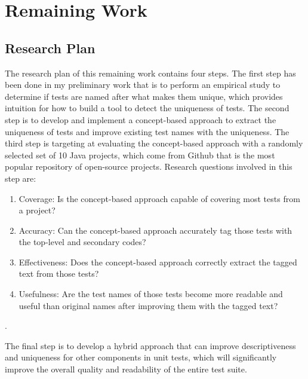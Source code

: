 

\section{Remaining Work}
\label{sec:remaining-work}

\subsection{Research Plan}

The research plan of this remaining work contains four steps.
%
The first step has been done in my preliminary work that is to perform an empirical study to determine if tests are named after what makes them unique, which provides intuition for how to build a tool to detect the uniqueness of tests.
%
The second step is to develop and implement a concept-based approach to extract the uniqueness of tests and improve existing test names with the uniqueness.
%
The third step is targeting at evaluating the concept-based approach with a randomly selected set of \num{10} Java projects, which come from Github that is the most popular repository of open-source projects.
%
Research questions involved in this step are:
\begin{enumerate}
    \item Coverage: Is the concept-based approach capable of covering most tests from a project?
    \item Accuracy: Can the concept-based approach accurately tag those tests with the top-level and secondary codes?
    \item Effectiveness: Does the concept-based approach correctly extract the tagged text from those tests?
    \item Usefulness: Are the test names of those tests become more readable and useful than original names after improving them with the tagged text?
\end{enumerate}.

The final step is to develop a hybrid approach that can improve descriptiveness and uniqueness for other components in unit tests, which will significantly improve the overall quality and readability of the entire test suite.


